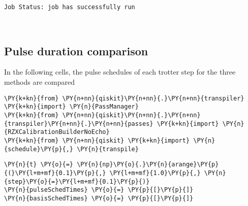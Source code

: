     \begin{Verbatim}[commandchars=\\\{\}]
Job Status: job has successfully run
    \end{Verbatim}

    \begin{center}
    \end{center}
    { \hspace*{\fill} \\}
    
    \hypertarget{pulse-duration-comparison}{%
\subsection{Pulse duration comparison}\label{pulse-duration-comparison}}

In the following cells, the pulse schedules of each trotter step for the
three methods are compared

    \begin{tcolorbox}[breakable, size=fbox, boxrule=1pt, pad at break*=1mm,colback=cellbackground, colframe=cellborder]
\begin{Verbatim}[commandchars=\\\{\}]
\PY{k+kn}{from} \PY{n+nn}{qiskit}\PY{n+nn}{.}\PY{n+nn}{transpiler} \PY{k+kn}{import} \PY{n}{PassManager}
\PY{k+kn}{from} \PY{n+nn}{qiskit}\PY{n+nn}{.}\PY{n+nn}{transpiler}\PY{n+nn}{.}\PY{n+nn}{passes} \PY{k+kn}{import} \PY{n}{RZXCalibrationBuilderNoEcho}
\PY{k+kn}{from} \PY{n+nn}{qiskit} \PY{k+kn}{import} \PY{n}{schedule}\PY{p}{,} \PY{n}{transpile}
\end{Verbatim}
\end{tcolorbox}

    \begin{tcolorbox}[breakable, size=fbox, boxrule=1pt, pad at break*=1mm,colback=cellbackground, colframe=cellborder]
\begin{Verbatim}[commandchars=\\\{\}]
\PY{n}{t} \PY{o}{=} \PY{n}{np}\PY{o}{.}\PY{n}{arange}\PY{p}{(}\PY{l+m+mf}{0.1}\PY{p}{,} \PY{l+m+mf}{1.0}\PY{p}{,} \PY{n}{step}\PY{o}{=}\PY{l+m+mf}{0.1}\PY{p}{)}
\PY{n}{pulseSchedTimes} \PY{o}{=} \PY{p}{[}\PY{p}{]}
\PY{n}{basisSchedTimes} \PY{o}{=} \PY{p}{[}\PY{p}{]}
\end{Verbatim}
\end{tcolorbox}

